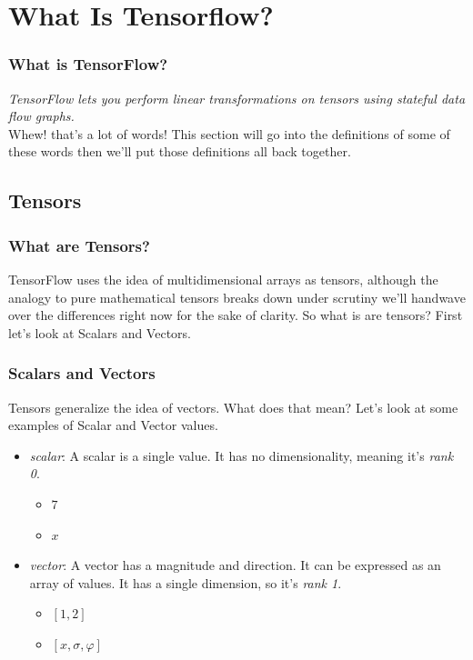 \documentclass{beamer}
\begin{document}
\section{What Is Tensorflow?}

\begin{frame}
  \frametitle{What is TensorFlow?}

  {\it TensorFlow lets you perform linear transformations on tensors
    using stateful data flow graphs.}\\
  \vfill
  Whew! that's a lot of words!  This section will
  go into the definitions of some of these words then we'll put those
  definitions all back together.
\end{frame}

\subsection{Tensors}

\begin{frame}[fragile]
  \frametitle{What are Tensors?}

  TensorFlow uses the idea of multidimensional arrays as tensors,
  although the analogy to pure mathematical tensors breaks down under
  scrutiny we'll handwave over the differences right now for the sake
  of clarity.  So what is are tensors?  First let's look at Scalars
  and Vectors.

\end{frame}

\begin{frame}
  \frametitle{Scalars and Vectors}

  Tensors generalize the idea of vectors.  What does that mean? Let's
  look at some examples of Scalar and Vector values.
  \begin{itemize}
  \item {\it scalar}: A scalar is a single value.  It has no
    dimensionality, meaning it's {\it rank 0}.
    \begin{itemize}
    \item $7$
    \item $x$
    \end{itemize}
  \item {\it vector}: A vector has a magnitude and direction.  It can
    be expressed as an array of values. It has a single dimension, so
    it's {\it rank 1}.
    \begin{itemize}
    \item $[1,2]$
    \item $[x,\sigma,\varphi]$
    \end{itemize}
  \end{itemize}
\end{frame}
\end{document}
